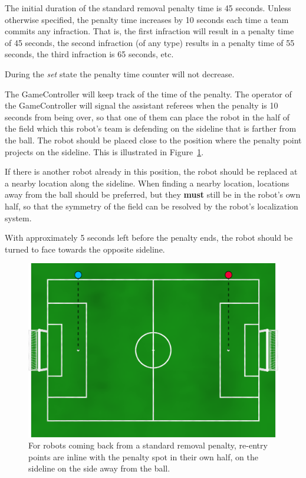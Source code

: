 \documentclass[12pt]{article}
\newcommand{\StandardPenaltyTime}{45 seconds\xspace}
\newcommand{\StandardPenaltyIncrease}{10 seconds\xspace}
\begin{document}
The initial duration of the standard removal penalty time is \StandardPenaltyTime.
Unless otherwise specified, the penalty time increases by \StandardPenaltyIncrease each time a team commits any infraction.
That is, the first infraction will result in a penalty time of 45 seconds, the second infraction (of any type) results in a penalty time of 55 seconds, the third infraction is 65 seconds, etc.

During the \emph{set} state the penalty time counter will not decrease.

The GameController will keep track of the time of the penalty. The operator of the GameController will signal the assistant referees when the penalty is 10 seconds from being over, so that one of them can place the robot in the half of the field which this robot's team is defending on the sideline that is farther from the ball. The robot should be placed close to the position where the penalty point projects on the sideline. This is illustrated in Figure~\ref{fig:penalty_re-entry_points}.

If there is another robot already in this position, the robot should be replaced at a nearby location along the sideline. When finding a nearby location, locations away from the ball should be preferred, but they \textbf{must} still be in the robot's own half, so that the symmetry of the field can be resolved by the robot's localization system.

With approximately 5 seconds left before the penalty ends, the robot should be turned to face towards the opposite sideline.

\begin{figure}[t]
\centerline{\includegraphics[width=\columnwidth]{figs/penalty_re-entry_points_2020.png}}
\caption{For robots coming back from a standard removal penalty, re-entry points  are inline with the penalty spot in their own half, on the sideline on the side away from the ball.}
\label{fig:penalty_re-entry_points}
\end{figure}
\end{document}
